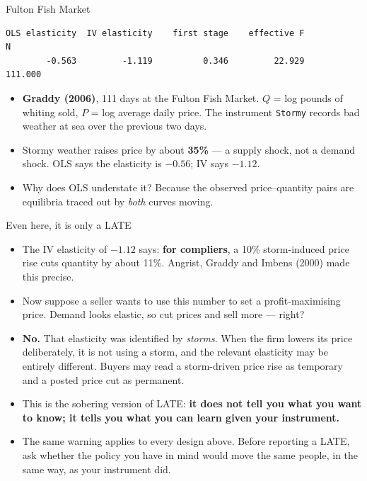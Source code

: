 \documentclass[
  11pt,
  ignorenonframetext,
  aspectratio=169,
]{beamer}
\providecommand{\tightlist}{%
  \setlength{\itemsep}{0pt}\setlength{\parskip}{0pt}}
\begin{document}
\begin{frame}[fragile]{Fulton Fish Market}
\begin{verbatim}
OLS elasticity  IV elasticity    first stage    effective F              N 
        -0.563         -1.119          0.346         22.929        111.000 
\end{verbatim}

\vspace{-0.2em}
\footnotesize

\begin{itemize}
\tightlist
\item
  \textbf{Graddy (2006)}, 111 days at the Fulton Fish Market. \(Q\) =
  log pounds of whiting sold, \(P\) = log average daily price. The
  instrument \texttt{Stormy} records bad weather at sea over the
  previous two days.
\item
  Stormy weather raises price by about \textbf{35\%} --- a supply shock,
  not a demand shock. OLS says the elasticity is \(-0.56\); IV says
  \(-1.12\).
\item
  Why does OLS understate it? Because the observed price--quantity pairs
  are equilibria traced out by \emph{both} curves moving.
\end{itemize}
\end{frame}

\begin{frame}{Even here, it is only a LATE}
\protect{}\label{even-here-it-is-only-a-late}
\begin{itemize}
\tightlist
\item
  The IV elasticity of \(-1.12\) says: \textbf{for compliers}, a 10\%
  storm-induced price rise cuts quantity by about 11\%. Angrist, Graddy
  and Imbens (2000) made this precise.
\item
  Now suppose a seller wants to use this number to set a
  profit-maximising price. Demand looks elastic, so cut prices and sell
  more --- right?
\item
  \textbf{No.} That elasticity was identified by \emph{storms}. When the
  firm lowers its price deliberately, it is not using a storm, and the
  relevant elasticity may be entirely different. Buyers may read a
  storm-driven price rise as temporary and a posted price cut as
  permanent.
\item
  This is the sobering version of LATE: \textbf{it does not tell you
  what you want to know; it tells you what you can learn given your
  instrument.}
\item
  The same warning applies to every design above. Before reporting a
  LATE, ask whether the policy you have in mind would move the same
  people, in the same way, as your instrument did.
\end{itemize}
\end{frame}
\end{document}
